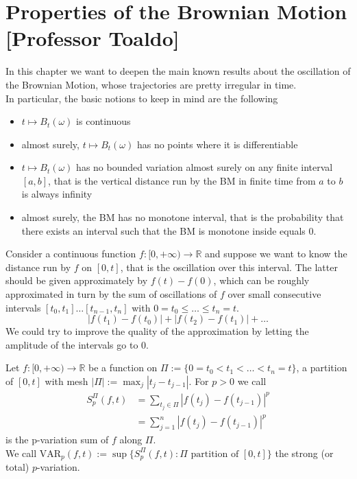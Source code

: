 \chapter{Properties of the Brownian Motion [Professor Toaldo]}
In this chapter we want to deepen the main known results about the oscillation of the Brownian Motion, whose trajectories are pretty irregular in time. \\
In particular, the basic notions to keep in mind are the following
\begin{itemize}
    \item $t \mapsto B_t(\omega)$ is continuous 
    \item almost surely, $t \mapsto B_t(\omega)$ has no points where it is differentiable
    \item $t \mapsto B_t(\omega)$ has no bounded variation almost surely on any finite interval $[a,b]$, that is the vertical distance run by the BM in finite time from $a$ to $b$ is always infinity
    \item almost surely, the BM has no monotone interval, that is the probability that there exists an interval such that the BM is monotone inside equals $0$. 
\end{itemize}
Consider a continuous function $f:[0,+\infty) \rightarrow \mathbb{R}$ and suppose we want to know the distance run by $f$ on $[0,t]$, that is the oscillation over this interval. The latter should be given approximately by $f(t) - f(0)$, which can be roughly approximated in turn by the sum of oscillations of $f$ over small consecutive intervals $[t_0, t_1] \ldots [t_{n-1}, t_n]$ with $0 = t_0 \leq \ldots \leq t_n = t$. 
\begin{equation*}
    |f(t_1) - f(t_0)|+|f(t_2) - f(t_1)|+ \ldots
\end{equation*}
We could try to improve the quality of the approximation by letting the amplitude of the intervals go to $0$. 
\begin{DefBox}
    \begin{Def}
    Let $f:[0,+\infty) \to \mathbb{R}$ be a function on $\Pi := \{0 = t_0 < t_1 < \ldots < t_n = t\}$, a partition of $[0,t]$ with mesh $|\Pi| := \max_j |t_j - t_{j-1}|$. For $p > 0$ we call 
    \begin{align*}
        S_p^\Pi(f,t) &= \sum_{t_j \in \Pi} |f(t_j) - f(t_{j-1})|^p\\
        &= \sum_{j=1}^n |f(t_j) - f(t_{j-1})|^p
    \end{align*}
    is the p-variation sum of $f$ along $\Pi$. \\
    We call $\text{VAR}_p(f,t) := \sup\{S_p^\Pi(f,t): \Pi \text{ partition of } [0,t]\}$ the strong (or total) $p$-variation.
\end{Def}
\end{DefBox}

